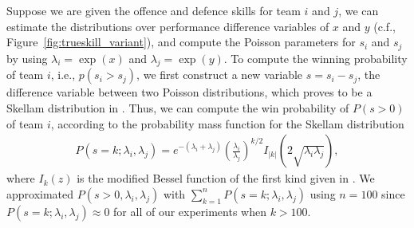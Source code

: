 
Suppose we
are given the offence and defence skills for team $i$ and $j$, we can
estimate the distributions over performance difference variables of
$x$ and $y$ (c.f., Figure~\ref{fig:trueskill_variant}), and compute
the Poisson parameters for $s_i$ and $s_j$ by using $\lambda_i =
\exp(x)$ and $\lambda_j = \exp(y)$. To compute the winning probability
of team $i$, i.e., $p(s_i>s_j)$, we first construct a new variable $s
= s_i-s_j$, the difference variable between two Poisson distributions,
which proves to be a Skellam distribution in
\cite{Skellam46TheFrequencyDistribution}. Thus, we can compute the win
probability of $P(s>0)$ of team $i$, according to the probability mass
function for the Skellam distribution
\begin{align*}
     P(s=k; \lambda_i, \lambda_j) =e^{-(\lambda_i+\lambda_j)}\left(\frac{\lambda_i}{\lambda_j}\right)^{k/2}I_{|k|}\left(2\sqrt{\lambda_i\lambda_j}\right),
\end{align*}
where $I_{k}(z)$ is the modified Bessel function of the first kind given in \cite{Abramowitz74HandbookOfMathematical}.
We approximated $P(s>0,\lambda_i, \lambda_j)$ with
$\sum_{k=1}^{n} P(s=k; \lambda_i, \lambda_j)$ using $n=100$ since
$P(s=k; \lambda_i, \lambda_j) \approx 0$ for all of our experiments
when $k>100$.

